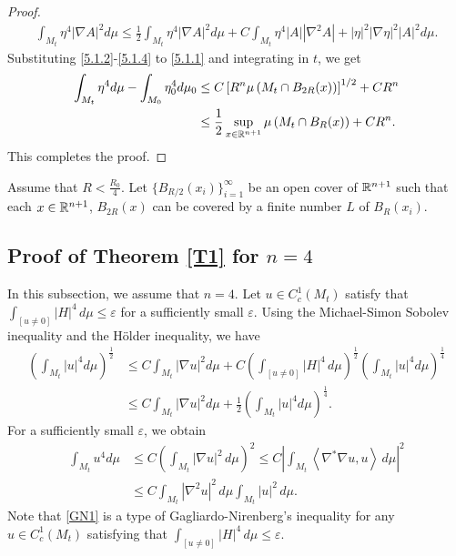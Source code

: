 \documentclass{amsart}
\theoremstyle{definition}
\def\R{{\Bbb R}}
\numberwithin{equation}{section}
\begin{document}
\begin{proof}
\begin{align}\label{5.1.4}
  \int_{M_t}  \eta ^{4}  |\nabla A|^2 d\mu   \leq \frac 1 2 \int_{M_t}  \eta ^{4}  |\nabla A|^2 d\mu + C\int_{M_t}  \eta ^{4}  |A| |\nabla^2 A|   +
  |\eta|^2 |\nabla \eta|^2  |A|^2  d\mu.
  \end{align}
Substituting \eqref{5.1.2}-\eqref{5.1.4}  to \eqref{5.1.1} and  integrating in $t$,  we get
\begin{align}
    \int_{M_t}  \eta ^{4} d\mu -\int_{M_0}  \eta_0 ^{4} d\mu_0
  &\leq  C \left [R^n\mu \left (  M_t\cap B_{2R}(x) \right )\right ]^{1/2}+CR^n \nonumber\\
  &\leq \frac 12 \sup_{x\in \R^{n+1}}\mu \left (  M_t\cap B_{R}(x)\right )+ CR^n.\nonumber
\end{align}
This completes the proof. \end{proof}



Assume that $R<\frac {R_0}4$.
   Let $\{B_{R/2}(x_i)\}_{i=1}^{\infty}$ be an open cover of $\R^{n+1}$ such that   each $x\in \R^{n+1}$, $B_{2R}(x)$ can be covered by a finite number $L$
   of $B_R(x_i)$.


\subsection{Proof of Theorem  \ref{T1} for $n=4$}
In this subsection, we assume that $n=4$.
Let $u\in
C^{1}_{c}\left( M_t \right)$ satisfy  that $\int_{[u\neq 0]}|H|^4\,d\mu\leq \varepsilon$ for a sufficiently small $\varepsilon$.
 Using the Michael-Simon Sobolev inequality   and the H\"older  inequality,  we have
 \begin{align*}
 \left( \int_{M_t} |u|^{4} d\mu \right)^{\frac 1 2 }
&\leq C \int_{M_t} \left| \nabla u\right|^2 d\mu +C
\left (\int_{[u\neq 0]}   \left| H \right|^4 \,d\mu\right )^{\frac 1 2}   \left( \int_{M_t} \left| u\right|^{4}  d\mu \right)^{\frac 1 4}\\
&\leq  C \int_{M_t} \left| \nabla u\right|^2 d\mu +\frac  12   \left( \int_{M_t} \left| u\right|^{4} d\mu \right)^{\frac 1 4}.
\nonumber
\end{align*}
 For a sufficiently small $\varepsilon$,  we obtain
\begin{align}\label{GN1}
 \int_{M_t} u^{4} d\mu  &\leq C \left( \int_{M_t}  \left| \nabla u\right|^2  \,d\mu\right)^{2} \leq C \left |\int_{M_t}  \left< \nabla^*\nabla u,
 u\right>
 \,d\mu\right |^2\\
&\leq C  \int_{M_t} |\nabla^2 u|^2 \,d\mu   \int_{M_t} |  u|^2  \,d\mu .
\nonumber
\end{align}
Note that \eqref{GN1}
is a type of Gagliardo-Nirenberg's inequality  for any $u\in
C^{1}_{c}\left( M_t \right)$ satisfying  that $\int_{[u\neq 0]}|H|^4\,d\mu\leq \varepsilon$.
\end{document}
